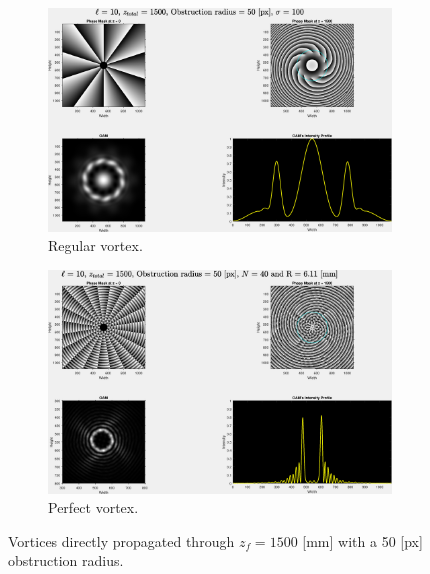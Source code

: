 \begin{figure}[htbp]
    \centering
    \begin{subfigure}[b]{0.45\textwidth}
        \centering
        \includegraphics[width=\textwidth]{images/c04/type=0_r=50_zi=0_zf=1500.eps}
        \caption{Regular vortex.}
    \end{subfigure}
    \hfill
    \begin{subfigure}[b]{0.45\textwidth}
        \centering
        \includegraphics[width=\textwidth]{images/c04/type=1_r=50_zi=0_zf=1500.eps}
        \caption{Perfect vortex.}
    \end{subfigure}
    \caption{Vortices directly propagated through $z_f = 1500$ [mm] with a 50 [px] obstruction radius.}
    \label{fig:Vortices_r=50_z=1500}
\end{figure}

